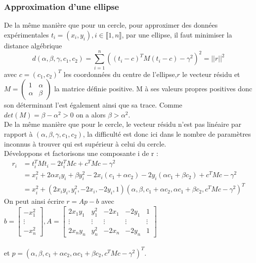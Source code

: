          \subsubsection{Approximation d'une ellipse}
         De la même manière que pour un cercle, pour approximer des données expérimentales $t_i = (x_i,y_i), i\in \llbracket 1,n\rrbracket$, par une ellipse, il faut minimiser la distance algébrique
         $$d(\alpha,\beta,\gamma,c_1,c_2)=\sum_{i=1}^n ((t_i-c)^T M(t_i-c)-\gamma^2)^2=||r||^2$$
         avec $c=(c_1,c_2)^T$ les coordonnées du centre de l'ellipse,$r$ le vecteur résidu et $ M=\begin{pmatrix}1&\alpha\\\alpha&\beta\end{pmatrix} $ la matrice définie positive. M à ses valeurs propres positives donc son déterminant l'est également ainsi que sa trace. Comme $det(M) = \beta - \alpha^2>0$ on a alors $\beta>\alpha^2.$\\
         De la même manière que pour le cercle, le vecteur résidu n'est pas linéaire par rapport à $(\alpha, \beta, \gamma, c_1,c_2)$, la difficulté est donc ici dans le nombre de paramètres inconnus à trouver qui est supérieur à celui du cercle.
         \\Développons et factorisons une composante i de r :
         \begin{align*}
             r_i&=t_i^TMt_i-2t_i^TMc+c^TMc-\gamma^2\\
             &=x_i^2+2\alpha x_iy_i+\beta y_i^2-2x_i(c_1+\alpha c_2)-2y_i(\alpha c_1+\beta c_2)+c^TMc-\gamma^2\\
             &=x_i^2 + (2x_iy_i,y_i^2,-2x_i,-2y_i,1)(\alpha,\beta,c_1+\alpha c_2, \alpha c_1+\beta c_2,c^TMc-\gamma^2)^T
         \end{align*}
         On peut ainsi écrire $r = Ap-b$ avec $b=\begin{bmatrix}-x_1^2\\\vdots\\-x_n^2         
         \end{bmatrix}, A = \begin{bmatrix}
             2x_1y_1&y_1^2&-2x_1&-2y_1&1\\
             \vdots&\vdots&\vdots&\vdots&\vdots\\
             2x_ny_n&y_n^2&-2x_n&-2y_n&1
         \end{bmatrix}$ \\\\et $p=(\alpha,\beta,c_1+\alpha c_2, \alpha c_1+\beta c_2,c^TMc-\gamma^2)^T$.
